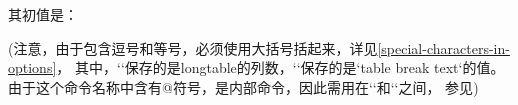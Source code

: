   其初值是：


  (注意，由于包含逗号和等号，必须使用大括号括起来，详见\cref{special-characters-in-options}，
  其中，`\the\LT@cols`保存的是longtable的列数，`\object@tableBreakText`保存的是`table break text`的值。
  由于这个命令名称中含有@符号，是内部命令，因此需用在`\makeatletter`和`\makeatother`之间，
  参见\autocite{texexchange_make_at})

\bigpar

